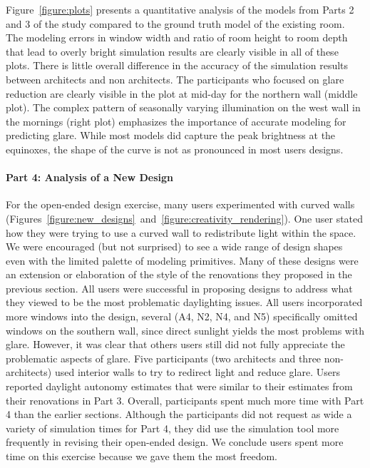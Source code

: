 Figure~\ref{figure:plots} presents a quantitative analysis of the
models from Parts 2 and 3 of the study compared to the ground truth
model of the existing room.  The modeling errors in window width and
ratio of room height to room depth
that lead to overly bright simulation results are clearly visible in
all of these plots.  There is little overall difference in the
accuracy of the simulation results between architects and non
architects.  The participants who focused on glare reduction are
clearly visible in the plot at mid-day for the northern wall (middle
plot).  The complex pattern of seasonally varying illumination on the
west wall in the mornings (right plot) emphasizes the importance of
accurate modeling for predicting glare.  While most models did capture
the peak brightness at the equinoxes, the shape of the curve is not as
pronounced in most users designs.

\paragraph{Part 4: Analysis of a New Design} 

For the open-ended design exercise, many users experimented with
curved walls
(Figures~\ref{figure:new_designs}~and~\ref{figure:creativity_rendering}).
One user stated how they were trying to use a curved wall to
redistribute light within the space.  We were encouraged (but not
surprised) to see a wide range of design shapes even with the limited
palette of modeling primitives.  Many of these designs were an
extension or elaboration of the style of the renovations they proposed
in the previous section.
%
All users were successful in proposing designs to address what they
viewed to be the most problematic daylighting issues. All users
incorporated more windows into the design, several (A4, N2, N4, and
N5) specifically omitted windows on the southern wall, since direct
sunlight yields the most problems with glare.  However, it was clear
that others users still did not fully appreciate the problematic
aspects of glare.  Five participants (two architects and three
non-architects) used interior walls to try to redirect light and
reduce glare.  Users reported daylight autonomy estimates that were
similar to their estimates from their renovations in Part 3.
%
Overall, participants spent much more time with Part 4 than the
earlier sections.  Although the participants did not request as wide a
variety of simulation times for Part 4, they did use the simulation
tool more frequently in revising their open-ended design.  We conclude
users spent more time on this exercise because we gave them the most
freedom.

